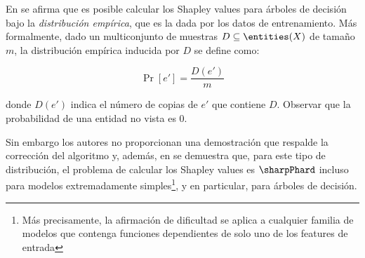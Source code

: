En \cite{lundberg2020local} se afirma que es posible calcular los Shapley values para árboles de decisión bajo la \textit{distribución empírica}, que es la dada por los datos de entrenamiento. Más formalmente, dado un multiconjunto de muestras \(D \subseteq \entities(X)\) de tamaño \(m\), la distribución empírica inducida por \(D\) se define como:

\[
\Pr[e'] = \frac{D(e')}{m} 
\]

donde \(D(e')\) indica el número de copias de \(e'\) que contiene \(D\). Observar que la probabilidad de una entidad no vista es 0.

Sin embargo los autores no proporcionan una demostración que respalde la corrección del algoritmo y, además, en \cite{van2022tractability} se demuestra que, para este tipo de distribución, el problema de calcular los Shapley values es \(\sharpPhard\) incluso para modelos extremadamente simples\footnote{Más precisamente, la afirmación de dificultad se aplica a cualquier familia de modelos que contenga funciones dependientes de solo uno de los features de entrada}, y en particular, para árboles de decisión.

\begin{comment}
    Sacó esto de acá porque literal menciono lo mismo acá: "En \cite{van2022tractability}, se demostró que...", además era NP-Hard, no #P-Hard
    
    Por último, en \cite{van2022tractability} también se demuestra que el problema es \(\sharpPhard\) al considerar el modelo trivial \(f(x_1,\ldots,x_n) = x_1\) y una distribución Naive Bayes. Una distribución Naive Bayes asume que los features son independientes entre sí, dado el valor de la variable objetivo. \sergio{trataría de explicar un poco más o dar un ejemplito}\santi{Aparte, creo que la definición en ese contexto no es esta. Ellos tienen una red bayesiana que modela las correlaciones entre los features. Por otro lado completamente distinto está el valor del modelo con una cierta entrada. El punto es que una red naive bayes es básicamente dos distribuciones independientes, moduladas por una única feature de la cual depende qué indpendiente se usa.}
\end{comment}


\begin{comment}
Matemáticamente, esto se representa como 
\[
P(X_1, X_2, \ldots, X_n | Y) = \prod_{i=1}^n P(X_i | Y)
\]    
\end{comment}

